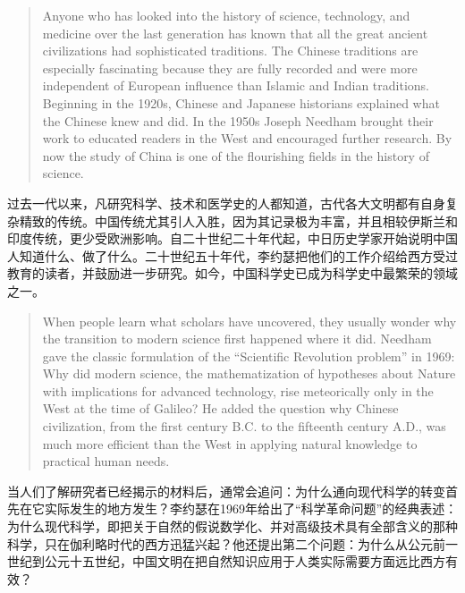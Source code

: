 \documentclass[UTF8,zihao=-4]{ctexart}
\newenvironment{enblock}
  {\par\smallskip\noindent{\scriptsize\bfseries English}\par\begin{quote}\small}
  {\end{quote}}
\newenvironment{zhblock}
  {\par\noindent{\scriptsize\bfseries 中文}\par}
  {\par\medskip}
\begin{document}
\begin{enblock}
Anyone who has looked into the history of science, technology, and medicine over the last generation has known that all the great ancient civilizations had sophisticated traditions. The Chinese traditions are especially fascinating because they are fully recorded and were more independent of European influence than Islamic and Indian traditions. Beginning in the 1920s, Chinese and Japanese historians explained what the Chinese knew and did. In the 1950s Joseph Needham brought their work to educated readers in the West and encouraged further research. By now the study of China is one of the flourishing fields in the history of science.
\end{enblock}
\begin{zhblock}
过去一代以来，凡研究科学、技术和医学史的人都知道，古代各大文明都有自身复杂精致的传统。中国传统尤其引人入胜，因为其记录极为丰富，并且相较伊斯兰和印度传统，更少受欧洲影响。自二十世纪二十年代起，中日历史学家开始说明中国人知道什么、做了什么。二十世纪五十年代，李约瑟把他们的工作介绍给西方受过教育的读者，并鼓励进一步研究。如今，中国科学史已成为科学史中最繁荣的领域之一。
\end{zhblock}

\begin{enblock}
When people learn what scholars have uncovered, they usually wonder why the transition to modern science first happened where it did. Needham gave the classic formulation of the ``Scientific Revolution problem'' in 1969: Why did modern science, the mathematization of hypotheses about Nature with implications for advanced technology, rise meteorically only in the West at the time of Galileo? He added the question why Chinese civilization, from the first century B.C. to the fifteenth century A.D., was much more efficient than the West in applying natural knowledge to practical human needs.
\end{enblock}
\begin{zhblock}
当人们了解研究者已经揭示的材料后，通常会追问：为什么通向现代科学的转变首先在它实际发生的地方发生？李约瑟在1969年给出了“科学革命问题”的经典表述：为什么现代科学，即把关于自然的假说数学化、并对高级技术具有全部含义的那种科学，只在伽利略时代的西方迅猛兴起？他还提出第二个问题：为什么从公元前一世纪到公元十五世纪，中国文明在把自然知识应用于人类实际需要方面远比西方有效？
\end{zhblock}
\end{document}
